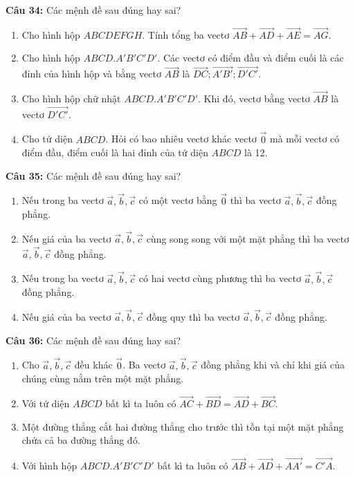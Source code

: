 \documentclass[12pt]{article}
\begin{document}
	\noindent \textbf{Câu 34:} Các mệnh đề sau đúng hay sai?
	\begin{enumerate}[label=\alph*)]
		\item Cho hình hộp $ABCDEFGH$. Tính tổng ba vectơ $\overrightarrow{AB} + \overrightarrow{AD} + \overrightarrow{AE} = \overrightarrow{AG}$.
		\item Cho hình hộp $ABCD.A'B'C'D'$. Các vectơ có điểm đầu và điểm cuối là các đỉnh của hình hộp và bằng vectơ $\overrightarrow{AB}$ là $\overrightarrow{DC}; \overrightarrow{A'B'}; \overrightarrow{D'C'}$.
		\item Cho hình hộp chữ nhật $ABCD.A'B'C'D'$. Khi đó, vectơ bằng vectơ $\overrightarrow{AB}$ là vectơ $\overrightarrow{D'C'}$.
		\item Cho tứ diện $ABCD$. Hỏi có bao nhiêu vectơ khác vectơ $\vec{0}$ mà mỗi vectơ có điểm đầu, điểm cuối là hai đỉnh của tứ diện $ABCD$ là 12.
	\end{enumerate}
	
	\vspace{0.2cm}
	\noindent \textbf{Câu 35:} Các mệnh đề sau đúng hay sai?
	\begin{enumerate}[label=\alph*)]
		\item Nếu trong ba vectơ $\vec{a}, \vec{b}, \vec{c}$ có một vectơ bằng $\vec{0}$ thì ba vectơ $\vec{a}, \vec{b}, \vec{c}$ đồng phẳng.
		\item Nếu giá của ba vectơ $\vec{a}, \vec{b}, \vec{c}$ cùng song song với một mặt phẳng thì ba vectơ $\vec{a}, \vec{b}, \vec{c}$ đồng phẳng.
		\item Nếu trong ba vectơ $\vec{a}, \vec{b}, \vec{c}$ có hai vectơ cùng phương thì ba vectơ $\vec{a}, \vec{b}, \vec{c}$ đồng phẳng.
		\item Nếu giá của ba vectơ $\vec{a}, \vec{b}, \vec{c}$ đồng quy thì ba vectơ $\vec{a}, \vec{b}, \vec{c}$ đồng phẳng.
	\end{enumerate}
	
	\vspace{0.2cm}
	\noindent \textbf{Câu 36:} Các mệnh đề sau đúng hay sai?
	\begin{enumerate}[label=\alph*)]
		\item Cho $\vec{a}, \vec{b}, \vec{c}$ đều khác $\vec{0}$. Ba vectơ $\vec{a}, \vec{b}, \vec{c}$ đồng phẳng khi và chỉ khi giá của chúng cùng nằm trên một mặt phẳng.
		\item Với tứ diện $ABCD$ bất kì ta luôn có $\overrightarrow{AC} + \overrightarrow{BD} = \overrightarrow{AD} + \overrightarrow{BC}$.
		\item Một đường thẳng cắt hai đường thẳng cho trước thì tồn tại một mặt phẳng chứa cả ba đường thẳng đó.
		\item Với hình hộp $ABCD.A'B'C'D'$ bất kì ta luôn có $\overrightarrow{AB} + \overrightarrow{AD} + \overrightarrow{AA'} = \overrightarrow{C'A}$.
	\end{enumerate}
	
\end{document}
